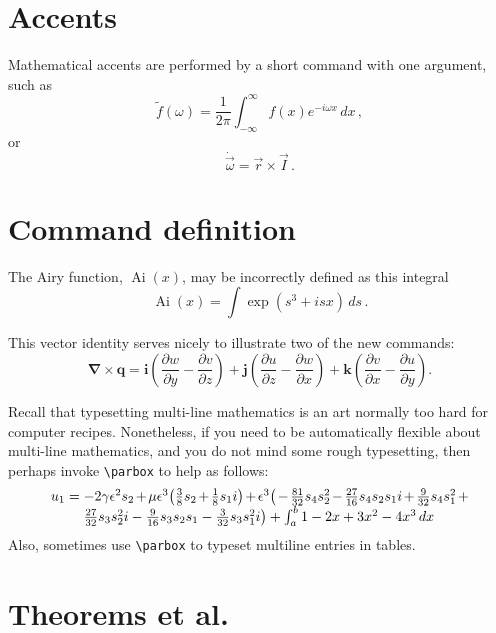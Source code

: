 \documentclass[12pt,a4paper]{extarticle}
\begin{document}
\section{Accents}

Mathematical accents are performed by a short command with one 
argument, such as
\[
	\tilde f(\omega)=\frac{1}{2\pi}
	\int_{-\infty}^\infty f(x)e^{-i\omega x}\,dx\,,
\]
or
\[
	\dot{\vec \omega}=\vec r\times\vec I\,.
\]





\section{Command definition}

\newcommand{\Ai}{\operatorname{Ai}} 
The Airy function, $\Ai(x)$, may be incorrectly defined as this 
integral
\[
	\Ai(x)=\int\exp(s^3+isx)\,ds\,.
\]

\newcommand{\D}[2]{\frac{\partial #2}{\partial #1}}
\newcommand{\DD}[2]{\frac{\partial^2 #2}{\partial #1^2}}
\renewcommand{\vec}[1]{\boldsymbol{#1}}

This vector identity serves nicely to illustrate two of the new 
commands:
\[
	\vec\nabla\times\vec q
	=\vec i\left(\D yw-\D zv\right)
	+\vec j\left(\D zu-\D xw\right)
	+\vec k\left(\D xv-\D yu\right).
\]

Recall that typesetting multi-line mathematics is an art normally too hard for computer recipes.  Nonetheless, if you 
need to be automatically flexible about multi-line mathematics, and you do not mind some rough typesetting, then perhaps
invoke \verb|\parbox| to help as follows: 
\newcommand{\parmath}[2][0.8\linewidth]{\parbox[t]{#1}%
    {\raggedright\linespread{1.2}\selectfont\(#2\)}}
\[
u_1=\parmath{ -2 \gamma  \epsilon^{2} s_{2}+\mu  \epsilon^{3} \big( \frac{3}{8} s_{2}+\frac{1}{8} s_{1} 
i\big)+\epsilon^{3} \big( -\frac{81}{32} s_{4} s_{2}^{2}-\frac{27}{16} s_{4} s_{2} s_{1} i+\frac{9}{32} s_{4} 
s_{1}^{2}+\frac{27}{32} s_{3} s_{2}^{2} i-\frac{9}{16} s_{3} s_{2} s_{1}-\frac{3}{32} s_{3} s_{1}^{2} i\big) 
+\int_a^b 1-2x+3x^2-4x^3\,dx }
\]
Also, sometimes use \verb|\parbox| to typeset multiline entries in tables.


\section{Theorems et al.}

\newtheorem{theorem}{Theorem}
\newtheorem{corollary}[theorem]{Corollary}
\newtheorem{lemma}[theorem]{Lemma}
\newtheorem{definition}[theorem]{Definition}
\end{document}
